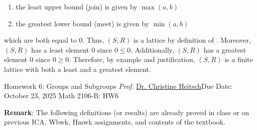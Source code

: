 \begin{enumerate}
\begin{enumerate}
\begin{subanswer}
      \begin{enumerate}
        \item the least upper bound (join) is given by $\max(a,b)$
        \item the greatest lower bound (meet) is given by $\min(a,b)$
      \end{enumerate}
      which are both equal to $0$. Thus, $(S, R)$ is a lattice by definition of .\proofstep
      Moreover, $(S, R)$ has a least element $0$ since $0 \leq 0$.
      Additionally, $(S, R)$ has a greatest element $0$ since $0 \geq 0$.\proofstep
      Therefore, by example and justification, $(S, R)$ is a finite lattice with both a least and a greatest element.
    \end{subanswer}
  \end{enumerate}








\end{enumerate}








































\newpage{}
{Homework 6: Groups and Subgroups}
{\textit{Prof.} \href{https://ceheitsch.github.io/webpage/}{Dr. Christine Heitsch}}{Due Date: October 23, 2025}
{Math 2106-B: HW6}


\newpage
\textbf{Remark}: The following definitions (or results) are already proved in class or on previous ICA, 
Wbwk, Hmwk assignments, and contents of the textbook.



